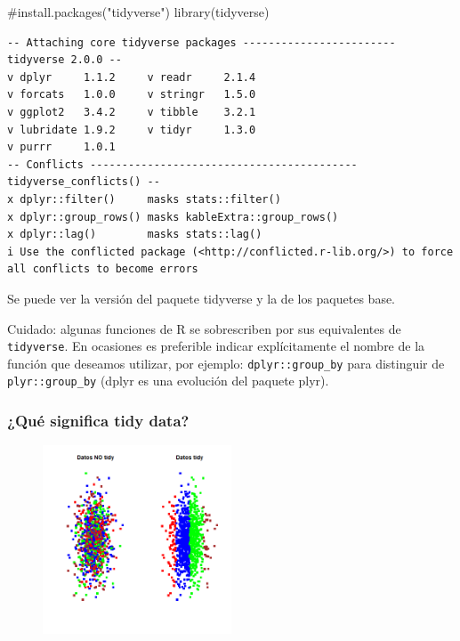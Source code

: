 \documentclass[
  letterpaper,
  DIV=11,
  numbers=noendperiod]{scrreprt}
\newenvironment{Shaded}{\begin{snugshade}}{\end{snugshade}}
\newcommand{\CommentTok}[1]{\textcolor[rgb]{0.37,0.37,0.37}{#1}}
\newcommand{\FunctionTok}[1]{\textcolor[rgb]{0.28,0.35,0.67}{#1}}
\newcommand{\NormalTok}[1]{\textcolor[rgb]{0.00,0.23,0.31}{#1}}
\begin{document}
\begin{Shaded}
\begin{Highlighting}[]
\CommentTok{\#install.packages("tidyverse")}
\FunctionTok{library}\NormalTok{(tidyverse)}
\end{Highlighting}
\end{Shaded}

\begin{verbatim}
-- Attaching core tidyverse packages ------------------------ tidyverse 2.0.0 --
v dplyr     1.1.2     v readr     2.1.4
v forcats   1.0.0     v stringr   1.5.0
v ggplot2   3.4.2     v tibble    3.2.1
v lubridate 1.9.2     v tidyr     1.3.0
v purrr     1.0.1     
-- Conflicts ------------------------------------------ tidyverse_conflicts() --
x dplyr::filter()     masks stats::filter()
x dplyr::group_rows() masks kableExtra::group_rows()
x dplyr::lag()        masks stats::lag()
i Use the conflicted package (<http://conflicted.r-lib.org/>) to force all conflicts to become errors
\end{verbatim}

Se puede ver la versión del paquete tidyverse y la de los paquetes base.

{Cuidado}: algunas funciones de R se sobrescriben por sus equivalentes
de \texttt{tidyverse}. En ocasiones es preferible indicar explícitamente
el nombre de la función que deseamos utilizar, por ejemplo:
\texttt{dplyr::group\_by} para distinguir de \texttt{plyr::group\_by}
(dplyr es una evolución del paquete plyr).

\hypertarget{quuxe9-significa-tidy-data}{%
\subsubsection{¿Qué significa tidy
data?}\label{quuxe9-significa-tidy-data}}

\begin{figure}

{\centering \includegraphics[width=0.5\textwidth,height=\textheight]{Figuras/plot_tidy.png}

}

\end{figure}
\end{document}
